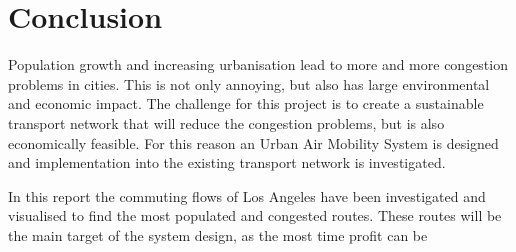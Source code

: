 \newpage
\chapter{Conclusion}
\label{Conclusion}

Population growth and increasing urbanisation lead to more and more congestion problems in cities. This is not only annoying, but also has large environmental and economic impact. The challenge for this project is to create a sustainable transport network that will reduce the congestion problems, but is also economically feasible. For this reason an Urban Air Mobility System is designed and implementation into the existing transport network is investigated. 

In this report the commuting flows of Los Angeles have been investigated and visualised to find the most populated and congested routes. These routes will be the main target of the system design, as the most time profit can be 